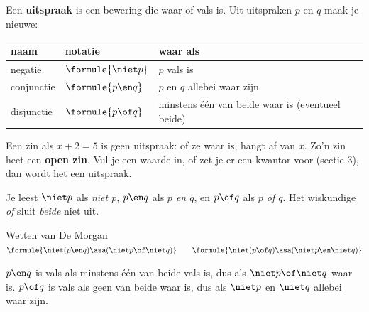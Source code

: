 \begin{theorie}
Een \textbf{\textcolor{accent}{uitspraak}} is een bewering die waar of vals is. Uit uitspraken $p$ en $q$ maak je nieuwe:

\vspace{1mm}
{\centering{}\renewcommand{\arraystretch}{1.45}%
\begin{tabular}{|>{\centering\arraybackslash}m{2.4cm}|>{\centering\arraybackslash}m{2cm}|>{\centering\arraybackslash}m{8.6cm}|}
\hline
\textbf{naam} & \textbf{notatie} & \textbf{waar als} \\ \hline
negatie & $\formule{\niet p}$ & $p$ vals is \\ \hline
conjunctie & $\formule{p \en q}$ & $p$ en $q$ allebei waar zijn \\ \hline
disjunctie & $\formule{p \of q}$ & minstens één van beide waar is (eventueel beide) \\ \hline
\end{tabular}\par}
\end{theorie}

Een zin als $x + 2 = 5$ is geen uitspraak: of ze waar is, hangt af van $x$. Zo'n zin heet een \textbf{open zin}. Vul je een waarde in, of zet je er een kwantor voor (sectie 3), dan wordt het een uitspraak.

Je leest $\niet p$ als \textit{niet $p$}, $p \en q$ als \textit{$p$ en $q$}, en $p \of q$ als \textit{$p$ of $q$}. Het wiskundige \textit{of} sluit \textit{beide} niet uit.

\begin{oefeningen}
\end{oefeningen}

\begin{theorie}
\begin{stelling}{Wetten van De Morgan}
\qquad $\formule{\niet(p \en q) \asa (\niet p \of \niet q)} \qquad \formule{\niet(p \of q) \asa (\niet p \en \niet q)}$
\end{stelling}

\begin{bewijs}
$p \en q$ is vals als minstens één van beide vals is, dus als $\niet p \of \niet q$ waar is. $p \of q$ is vals als geen van beide waar is, dus als $\niet p$ en $\niet q$ allebei waar zijn.
\end{bewijs}
\end{theorie}


